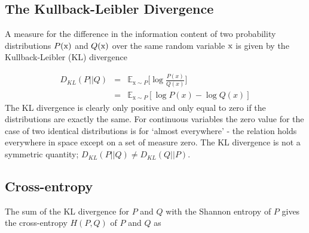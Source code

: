 \documentclass[twocolumn]{article}
\numberwithin{equation}{section}
\begin{document}



\subsection{The Kullback-Leibler Divergence}\label{appendix:kl_div_section}

A measure for the difference in the information content of two probability distributions $P(\textup{x})$ and 
$Q(\textup{x})$ over the same random variable $\textup{x}$ is given by the Kullback-Leibler (KL) divergence 

\begin{eqnarray}
  D_{KL}(P||Q) &=& \mathbb{E}_{\text{x}\sim P} \bigg [\log \frac{P(x)}{Q(x)} \bigg ]\nonumber \\ 
               &=& \mathbb{E}_{\text{x}\sim P} [\log P(x) - \log Q(x)]  %
\end{eqnarray}
The KL divergence is clearly only positive and only equal to zero if the distributions are exactly the same. For 
continuous variables the zero value for the case of two identical distributions is for `almost everywhere' - the 
relation holds everywhere in space except on a set of measure zero. The KL divergence is not a symmetric quantity; 
$D_{KL}(P||Q) \neq  D_{KL}(Q||P)$.


\subsection{Cross-entropy}\label{appendix:cross_entropy}
The sum of the KL divergence for $P$ and $Q$ with the Shannon entropy of $P$ gives the cross-entropy $H(P,Q)$ of $P$ and 
$Q$ as
\end{document}
